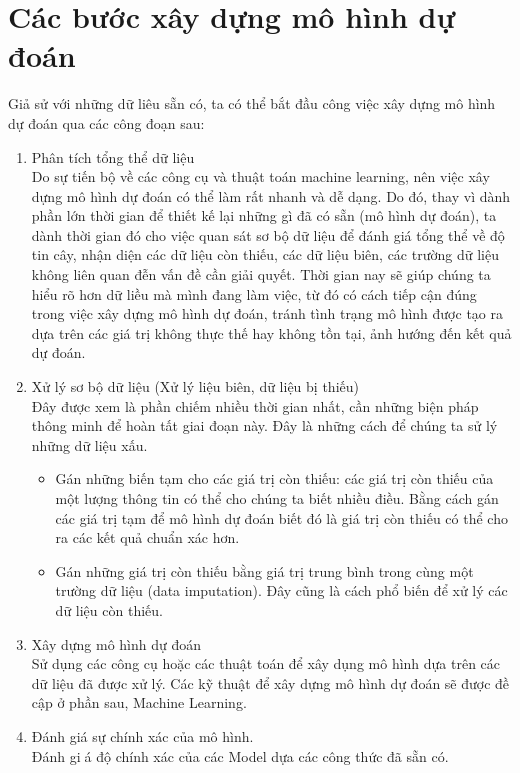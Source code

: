 \section{Các bước xây dựng mô hình dự đoán}
\label{sec:intro:buildmodel}
Giả sử với những dữ liêu sẵn có, ta có thể bắt đầu công việc xây dựng mô hình dự đoán qua các công đoạn sau:
\begin{enumerate}
    \item Phân tích tổng thể dữ liệu \\
    Do sự tiến bộ về các công cụ và thuật toán machine learning, nên việc xây dựng mô hình dự đoán có thể làm rất nhanh và dễ dạng. Do đó, thay vì dành phần lớn thời gian để thiết kế lại những gì đã có sẵn (mô hình dự đoán), ta dành thời gian đó cho việc quan sát sơ bộ dữ liệu để đánh giá tổng thể về độ tin cây, nhận diện các dữ liệu còn thiếu, các dữ liệu biên, các trường dữ liệu không liên quan đễn vấn đề cần giải quyết. Thời gian nay sẽ giúp chúng ta hiểu rõ hơn dữ liều mà mình đang làm việc, từ đó có cách tiếp cận đúng trong việc xây dựng mô hình dự đoán, tránh tình trạng mô hình được tạo ra dựa trên các giá trị không thực thế hay không tồn tại, ảnh hướng đến kết quả dự đoán.
    \item Xử lý sơ bộ dữ liệu (Xử lý liệu biên, dữ liệu bị thiếu) \\
    Đây được xem là phần chiếm nhiều thời gian nhất, cần những biện pháp thông minh để hoàn tất giai đoạn này. Đây là những cách để chúng ta sử lý những dữ liệu xấu.
    \begin{itemize}
	    \item Gán những biến tạm cho các giá trị còn thiếu: các giá trị còn thiếu của một  lượng thông tin có thể cho chúng ta biết nhiều điều. Bằng cách gán các giá trị tạm để mô hình dự đoán biết đó là giá trị còn thiếu có thể cho ra các kết quả chuẩn xác hơn. \\
	    \item Gán những giá trị còn thiếu bằng giá trị trung bình trong cùng một trường dữ liệu (data imputation). Đây cũng là cách phổ biến để xử lý các dữ liệu còn thiếu. \\
    \end{itemize}
    \item Xây dựng mô hình dự đoán \\
    Sử dụng các công cụ hoặc các thuật toán để xây dụng mô hình dựa trên các dữ liệu đã được xử lý. Các kỹ thuật để xây dựng mô hình dự đoán sẽ được đề cập ở phần sau, Machine Learning. \\
    \item Đánh giá sự chính xác của mô hình. \\
    Đánh giá độ chính xác của các Model dựa các công thức đã sẵn có. \\
\end{enumerate}

